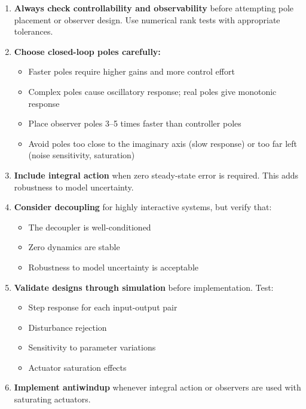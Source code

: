 \begin{enumerate}
    \item \textbf{Always check controllability and observability} before attempting pole placement or observer design. Use numerical rank tests with appropriate tolerances.

    \item \textbf{Choose closed-loop poles carefully:}
    \begin{itemize}
        \item Faster poles require higher gains and more control effort
        \item Complex poles cause oscillatory response; real poles give monotonic response
        \item Place observer poles 3--5 times faster than controller poles
        \item Avoid poles too close to the imaginary axis (slow response) or too far left (noise sensitivity, saturation)
    \end{itemize}

    \item \textbf{Include integral action} when zero steady-state error is required. This adds robustness to model uncertainty.

    \item \textbf{Consider decoupling} for highly interactive systems, but verify that:
    \begin{itemize}
        \item The decoupler is well-conditioned
        \item Zero dynamics are stable
        \item Robustness to model uncertainty is acceptable
    \end{itemize}

    \item \textbf{Validate designs through simulation} before implementation. Test:
    \begin{itemize}
        \item Step response for each input-output pair
        \item Disturbance rejection
        \item Sensitivity to parameter variations
        \item Actuator saturation effects
    \end{itemize}

    \item \textbf{Implement antiwindup} whenever integral action or observers are used with saturating actuators.
\end{enumerate}

